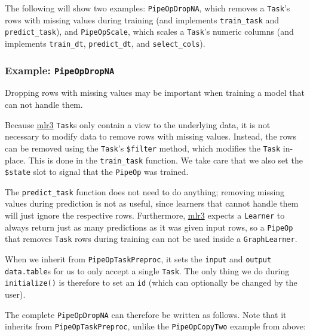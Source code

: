 \documentclass[
  11pt,
  parskip=half,
  DIV=calc,
  BCOR=10mm,
  x11names]{scrbook}
\begin{document}
The following will show two examples: \texttt{PipeOpDropNA}, which removes a \texttt{Task}'s rows with missing values during training (and implements \texttt{train\_task} and \texttt{predict\_task}), and \texttt{PipeOpScale}, which scales a \texttt{Task}'s numeric columns (and implements \texttt{train\_dt}, \texttt{predict\_dt}, and \texttt{select\_cols}).

\hypertarget{example-pipeopdropna}{%
\subsubsection{\texorpdfstring{Example: \texttt{PipeOpDropNA}}{Example: PipeOpDropNA}}\label{example-pipeopdropna}}

Dropping rows with missing values may be important when training a model that can not handle them.

Because \href{https://mlr3.mlr-org.com}{mlr3} \texttt{Task}s only contain a view to the underlying data, it is not necessary to modify data to remove rows with missing values.
Instead, the rows can be removed using the \texttt{Task}'s \texttt{\$filter} method, which modifies the \texttt{Task} in-place.
This is done in the \texttt{train\_task} function. We take care that we also set the \texttt{\$state} slot to signal that the \texttt{PipeOp} was trained.

The \texttt{predict\_task} function does not need to do anything; removing missing values during prediction is not as useful, since learners that cannot handle them will just ignore the respective rows.
Furthermore, \href{https://mlr3.mlr-org.com}{mlr3} expects a \texttt{Learner} to always return just as many predictions as it was given input rows, so a \texttt{PipeOp} that removes \texttt{Task} rows during training can not be used inside a \texttt{GraphLearner}.

When we inherit from \texttt{PipeOpTaskPreproc}, it sets the \texttt{input} and \texttt{output} \texttt{data.table}s for us to only accept a single \texttt{Task}.
The only thing we do during \texttt{initialize()} is therefore to set an \texttt{id} (which can optionally be changed by the user).

The complete \texttt{PipeOpDropNA} can therefore be written as follows.
Note that it inherits from \texttt{PipeOpTaskPreproc}, unlike the \texttt{PipeOpCopyTwo} example from above:
\end{document}
